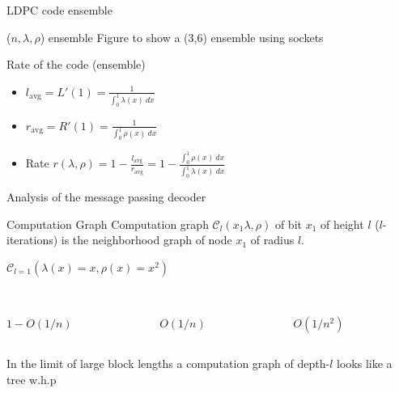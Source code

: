 \documentclass[10pt,xcolor=table]{beamer}
\begin{document}
\begin{frame}{LDPC code ensemble}
\begin{block}{($n,\lambda,\rho$) ensemble}
Figure to show a (3,6) ensemble using sockets
\end{block}
\end{frame}
\begin{frame}{Rate of the code (ensemble)}
\begin{itemize}
  \item $l_{\text{avg}} = L'(1) = \frac{1}{\int_{0}^{1} \lambda(x) \ dx}$
  \item $r_{\text{avg}} = R'(1) = \frac{1}{\int_{0}^{1} \rho(x) \ dx}$
  \item Rate $\boxed{r(\lambda,\rho) = 1-\frac{{l_{\text{avg}}}}{{r_{\text{avg}}}} = 1 - \frac{\int_{0}^{1} \rho(x) \ dx}{\int_{0}^{1} \lambda(x) \ dx}}$
\end{itemize}
\end{frame}
\begin{frame}{Analysis of the message passing decoder}
\begin{block}{Computation Graph}
Computation graph $\mathcal{C}_{l}(x_1\lambda,\rho)$ of bit $x_{1}$ of height $l$ ($l$-iterations) is the neighborhood graph of node $x_1$ of radius $l$.
\end{block}
$\mathcal{C}_{l=1}(\lambda(x)=x,\rho(x)=x^2)$
\begin{columns}
\begin{column}{0.33\textwidth}
\begin{center}
\scalebox{0.5}{}
\\$1-O(1/n)$
\end{center}
\end{column}

\begin{column}{0.33\textwidth}
\begin{center}
\scalebox{0.5}{}
\\$O(1/n)$
\end{center}
\end{column}

\begin{column}{0.33\textwidth}
\begin{center}
\scalebox{0.5}{}
\\$O(1/n^2)$
\end{center}
\end{column}

\end{columns}
\begin{block}{}
In the limit of large block lengths a computation graph of depth-$l$ looks like a tree w.h.p
\end{block}
\end{frame}
\end{document}
